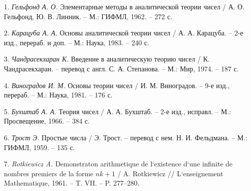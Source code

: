 \litlist

1. {\it Гельфонд А. О.} Элементарные методы в аналитической теории чисел / А. О. Гельфонд, Ю. В. Линник. -- М.: ГИФМЛ, 1962. -- 272 с.

2. {\it Карацуба А. А.} Основы аналитической теории чисел / А. А. Карацуба. -- 2-е изд., перераб. и доп. -- М.: Наука, 1983. -- 240 с.

3. {\it Чандрасекхаран К.} Введение в аналитическую теорию чисел / К. Чандрасекхаран. -- перевод с англ. С. А. Степанова. -- М.: Мир, 1974. -- 187 с.

4. {\it Виноградов И. М.} Основы теории чисел / И. М. Виноградов. -- 9-е изд., перераб. -- М.: Наука, 1981. -- 176 с.

5. {\it Бухштаб А. А.} Теория чисел / А. А. Бухштаб. -- 2-е изд., исправл. -- М.: Просвещение, 1966. -- 384 с.

6. {\it Трост Э.} Простые числа / Э. Трост. -- перевод с нем. Н. И. Фельдмана. -- М.: ГИФМЛ, 1959. -- 135 с.

7. {\it Rotkiewicz A.} Demonstraton arithmetique de l`existence d`une infinite de nombres premiers de la forme $nk+ 1$ / A. Rotkiewicz // L`enseignement Mathematique, 1961. -- T. VII. -- P. 277--280.




